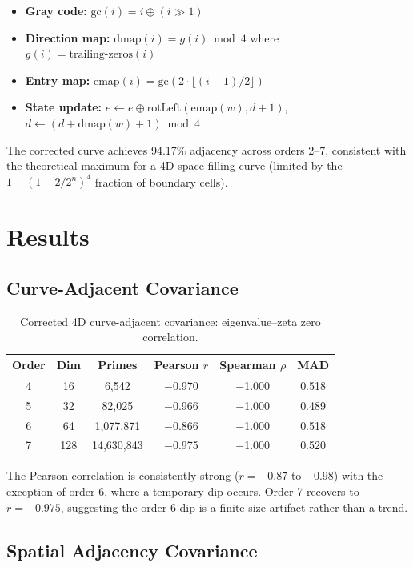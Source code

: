 \documentclass[11pt,a4paper]{article}
\begin{document}
\begin{itemize}
\item \textbf{Gray code:} $\text{gc}(i) = i \oplus (i \gg 1)$
\item \textbf{Direction map:} $\text{dmap}(i) = g(i) \bmod 4$ where
   $g(i) = \text{trailing-zeros}(i)$
\item \textbf{Entry map:} $\text{emap}(i) = \text{gc}(2 \cdot \lfloor(i-1)/2\rfloor)$
\item \textbf{State update:} $e \leftarrow e \oplus \text{rotLeft}(\text{emap}(w), d+1)$,
   $d \leftarrow (d + \text{dmap}(w) + 1) \bmod 4$
\end{itemize}

The corrected curve achieves 94.17\% adjacency across orders 2--7,
consistent with the theoretical maximum for a 4D space-filling curve
(limited by the $1 - (1 - 2/2^n)^4$ fraction of boundary cells).

\section{Results}

\subsection{Curve-Adjacent Covariance}

\begin{table}[h]
\centering
\begin{tabular}{cccccc}
\toprule
Order & Dim & Primes & Pearson $r$ & Spearman $\rho$ & MAD \\
\midrule
4 & 16 & 6,542 & $-$0.970 & $-$1.000 & 0.518 \\
5 & 32 & 82,025 & $-$0.966 & $-$1.000 & 0.489 \\
6 & 64 & 1,077,871 & $-$0.866 & $-$1.000 & 0.518 \\
7 & 128 & 14,630,843 & $-$0.975 & $-$1.000 & 0.520 \\
\bottomrule
\end{tabular}
\caption{Corrected 4D curve-adjacent covariance: eigenvalue--zeta zero correlation.}
\end{table}

The Pearson correlation is consistently strong ($r = -0.87$ to $-0.98$)
with the exception of order 6, where a temporary dip occurs.  Order 7
recovers to $r = -0.975$, suggesting the order-6 dip is a finite-size
artifact rather than a trend.

\subsection{Spatial Adjacency Covariance}
\end{document}
